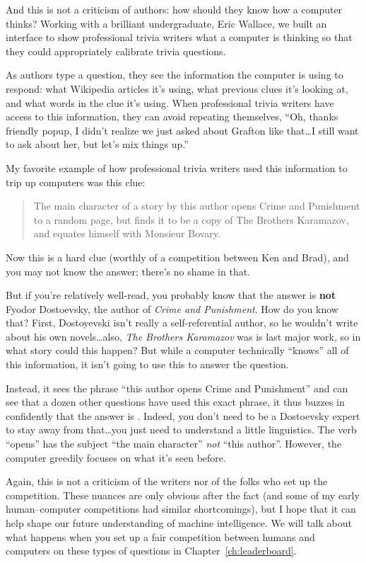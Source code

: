 And this is not a criticism of \jeopardy{} authors: how should they
know how a computer thinks?
%
Working with a brilliant undergraduate, Eric Wallace, we built an
interface to show professional trivia writers what a computer is
thinking so that they could appropriately calibrate trivia questions.

As authors type a question, they see the information the computer is
using to respond:
%
what Wikipedia articles it's using,
%
what previous clues it's looking at,
%
and what words in the clue it's using.
%
When professional trivia writers have access to this information, they can
avoid repeating themselves,
%
``Oh, thanks friendly popup, I didn't realize we just asked about
Grafton like that\dots I still want to ask about her, but let's mix
things up.''

My favorite example of how professional trivia writers used this information to trip up computers was this clue:
\begin{quote}
  The main character of a story by this author opens Crime and Punishment to a random page, but finds it to be a copy of The Brothers Karamazov, and equates himself with Monsieur Bovary.
\end{quote}
%
Now this is a hard clue (worthly of a competition between Ken and Brad), and you may not know the answer; there's no shame in that.

But if you're relatively well-read, you probably know that the answer is {\bf not} Fyodor Dostoevsky, the author of \textit{Crime and Punishment}.
%
How do you know that?  
%
First, Dostoyevski isn't really a self-referential author, so he wouldn't write about his own novels\dots also, \textit{The Brothers Karamazov} was is last major work, so in what story could this happen?
%
But while a computer technically ``knows'' all of this information, it isn't going to use this to answer the question.

Instead, it sees the phrase ``this author opens Crime and Punishment'' and can see that a dozen other questions have used this exact phrase, it thus buzzes in confidently that the answer is .
%
Indeed, you don't need to be a Dostoevsky expert to stay away from that\dots you just need to understand a little linguistics.
%
The verb ``opens'' has the subject ``the main character'' \emph{not} ``this author''.
%
However, the computer greedily focuses on what it's seen before.

Again, this is not a criticism of the \jeopardy{} writers nor of the  folks who set up the competition.
%
These nuances are only obvious after the fact (and some of my early human--computer competitions had similar shortcomings), but I hope that it can help shape our future understanding of machine intelligence.  
%
We will talk about what happens when you set up a fair competition between
humans and computers on these types of questions in
Chapter~\ref{ch:leaderboard}.

